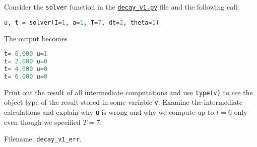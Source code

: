 \documentclass[graybox,sectrefs,envcountresetchap,open=right,final]{svmonodo}
\makeatletter
\newenvironment{doconceexercise}{}{}
\newcounter{doconceexercisecounter}%
\newcommand\listofexercises{
\chapter*{List of Exercises, Problems, and Projects
          \@mkboth{List of Exercises, Problems, and Projects}{List of Exercises, Problems, and Projects}}
\markboth{List of Exercises, Problems, and Projects}{List of Exercises, Problems, and Projects}
\@starttoc{loe}
}
\makeatother
\begin{document}
\begin{doconceexercise}

                
\label{decay:exer:decay1err}

Consider the \texttt{solver} function in the \href{{http://tinyurl.com/ofkw6kc/alg/decay_v1.py}}{\nolinkurl{decay_v1.py}} file
and the following call:



\begin{lstlisting}[language=python,style=blue1_bluegreen]
u, t = solver(I=1, a=1, T=7, dt=2, theta=1)

\end{lstlisting}

The output becomes






\begin{lstlisting}[language=Python,style=gray]
t= 0.000 u=1
t= 2.000 u=0
t= 4.000 u=0
t= 6.000 u=0

\end{lstlisting}

Print out the result of all intermediate computations and use
\texttt{type(v)} to see the object type of the result stored in some variable \texttt{v}.
Examine the intermediate calculations and explain
why \texttt{u} is wrong and why we compute up to $t=6$ only even though we
specified $T=7$.

\noindent Filename: \Verb!decay_v1_err!.

\end{doconceexercise}
\end{document}
